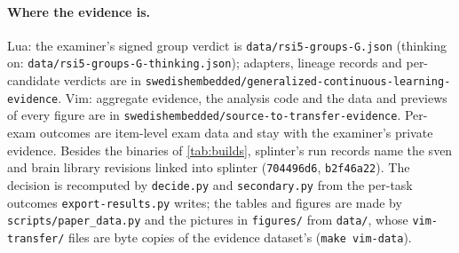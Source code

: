 \paragraph{Where the evidence is.} Lua: the examiner's signed group verdict is \nolinkurl{data/rsi5-groups-G.json}
(thinking on: \nolinkurl{data/rsi5-groups-G-thinking.json}); adapters, lineage records and per-candidate verdicts are in
\nolinkurl{swedishembedded/generalized-continuous-learning-evidence}. Vim: aggregate evidence, the analysis code and the data
and previews of every figure are in \nolinkurl{swedishembedded/source-to-transfer-evidence}. Per-exam outcomes are item-level
exam data and stay with the examiner's private evidence. Besides the binaries of \cref{tab:builds}, splinter's run records name
the sven and brain library revisions linked into splinter (\texttt{704496d6}, \texttt{b2f46a22}). The decision is recomputed
by \texttt{decide.py} and \texttt{secondary.py} from the per-task outcomes \texttt{export-results.py} writes; the tables and
figures are made by \nolinkurl{scripts/paper_data.py} and the pictures in \nolinkurl{figures/} from \nolinkurl{data/}, whose
\nolinkurl{vim-transfer/} files are byte copies of the evidence dataset's (\texttt{make vim-data}).
